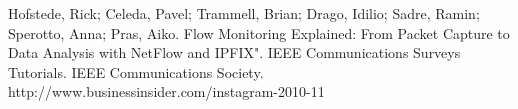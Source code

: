 \begin{thebibliography}{9}

Hofstede, Rick; Celeda, Pavel; Trammell, Brian; Drago, Idilio; Sadre, Ramin; Sperotto, Anna; Pras, Aiko. Flow Monitoring Explained: From Packet Capture to Data Analysis with NetFlow and IPFIX". IEEE Communications Surveys Tutorials. IEEE Communications Society.
http://www.businessinsider.com/instagram-2010-11

\end{thebibliography}
